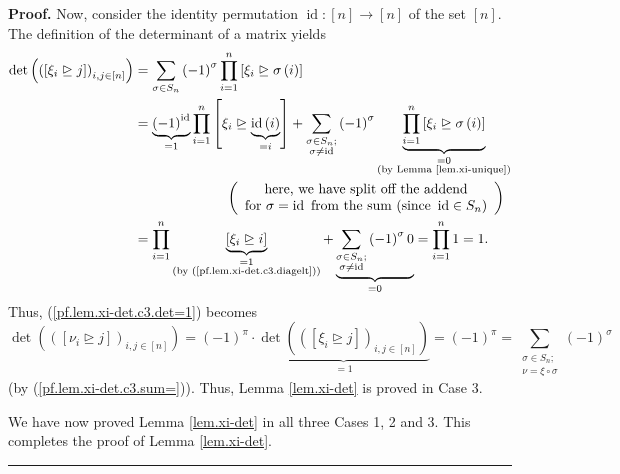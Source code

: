 \documentclass
[numbers=enddot,12pt,final,onecolumn,notitlepage,english]{scrartcl}%
\theoremstyle{definition}
\newenvironment{proof}[1][Proof]{\noindent\textbf{#1.} }{\ \rule{0.5em}{0.5em}}
\let\sumnonlimits\sum
\let\prodnonlimits\prod
\renewcommand{\sum}{\sumnonlimits\limits}
\renewcommand{\prod}{\prodnonlimits\limits}
\newenvironment{verlong}{}{}
\begin{document}
\begin{proof}
\begin{verlong}
Now, consider the identity permutation $\operatorname*{id}:\left[  n\right]
\rightarrow\left[  n\right]  $ of the set $\left[  n\right]  $. The definition
of the determinant of a matrix yields%
\begin{align*}
\det\left(  \left(  \left[  \xi_{i}\trianglerighteq j\right]  \right)
_{i,j\in\left[  n\right]  }\right)   &  =\sum_{\sigma\in S_{n}}\left(
-1\right)  ^{\sigma}\prod_{i=1}^{n}\left[  \xi_{i}\trianglerighteq
\sigma\left(  i\right)  \right] \\
&  =\underbrace{\left(  -1\right)  ^{\operatorname*{id}}}_{=1}\prod_{i=1}%
^{n}\left[  \xi_{i}\trianglerighteq\underbrace{\operatorname*{id}\left(
i\right)  }_{=i}\right]  +\sum_{\substack{\sigma\in S_{n};\\\sigma
\neq\operatorname*{id}}}\left(  -1\right)  ^{\sigma}\underbrace{\prod
_{i=1}^{n}\left[  \xi_{i}\trianglerighteq\sigma\left(  i\right)  \right]
}_{\substack{=0\\\text{(by Lemma \ref{lem.xi-unique})}}}\\
&  \ \ \ \ \ \ \ \ \ \ \ \ \ \ \ \ \ \ \ \ \left(
\begin{array}
[c]{c}%
\text{here, we have split off the addend}\\
\text{for }\sigma=\operatorname*{id}\text{ from the sum (since }%
\operatorname*{id}\in S_{n}\text{)}%
\end{array}
\right) \\
&  =\prod_{i=1}^{n}\underbrace{\left[  \xi_{i}\trianglerighteq i\right]
}_{\substack{=1\\\text{(by (\ref{pf.lem.xi-det.c3.diagelt}))}}%
}+\underbrace{\sum_{\substack{\sigma\in S_{n};\\\sigma\neq\operatorname*{id}%
}}\left(  -1\right)  ^{\sigma}0}_{=0}=\prod_{i=1}^{n}1=1.
\end{align*}
Thus, (\ref{pf.lem.xi-det.c3.det=1}) becomes%
\[
\det\left(  \left(  \left[  \nu_{i}\trianglerighteq j\right]  \right)
_{i,j\in\left[  n\right]  }\right)  =\left(  -1\right)  ^{\pi}\cdot
\underbrace{\det\left(  \left(  \left[  \xi_{i}\trianglerighteq j\right]
\right)  _{i,j\in\left[  n\right]  }\right)  }_{=1}=\left(  -1\right)  ^{\pi
}=\sum_{\substack{\sigma\in S_{n};\\\nu=\xi\circ\sigma}}\left(  -1\right)
^{\sigma}%
\]
(by (\ref{pf.lem.xi-det.c3.sum=})). Thus, Lemma \ref{lem.xi-det} is proved in
Case 3. \medskip
\end{verlong}

We have now proved Lemma \ref{lem.xi-det} in all three Cases 1, 2 and 3. This
completes the proof of Lemma \ref{lem.xi-det}.
\end{proof}
\end{document}
